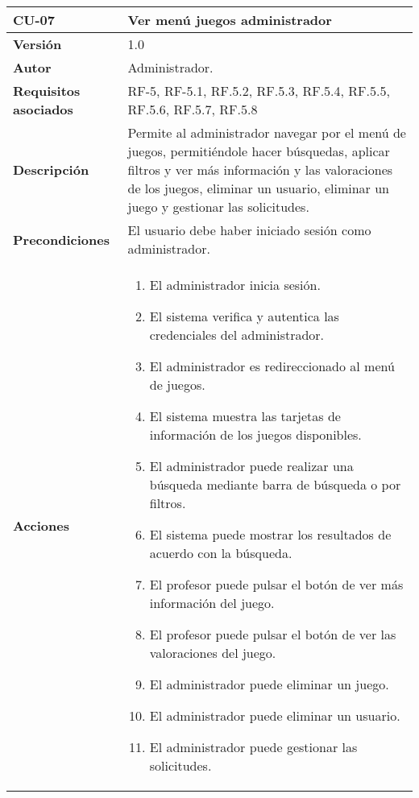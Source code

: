\begin{table}[h!]
	\centering
	\begin{tabularx}{\linewidth}{ p{} p{} }
		\toprule
		\textbf{CU-07}    & \textbf{Ver menú juegos administrador}\\
		\toprule
		\textbf{Versión}              & 1.0    \\
		\textbf{Autor}                & Administrador. \\
		\textbf{Requisitos asociados} & RF-5, RF-5.1, RF.5.2, RF.5.3, RF.5.4, RF.5.5, RF.5.6, RF.5.7, RF.5.8 \\
		\textbf{Descripción}          & Permite al administrador navegar por el menú de juegos, permitiéndole hacer búsquedas, aplicar filtros y ver más información y las valoraciones de los juegos, eliminar un usuario, eliminar un juego y gestionar las solicitudes.\\
		\textbf{Precondiciones}         & El usuario debe haber iniciado sesión como administrador. \\
		\textbf{Acciones}             &
		\begin{enumerate}
			\def\labelenumi{\arabic{enumi}.}
			\tightlist
			\item El administrador inicia sesión.
            \item El sistema verifica y autentica las credenciales del administrador.
            \item El administrador es redireccionado al menú de juegos.
            \item El sistema muestra las tarjetas de información de los juegos disponibles.
            \item El administrador puede realizar una búsqueda mediante barra de búsqueda o por filtros.
            \item El sistema puede mostrar los resultados de acuerdo con la búsqueda.
            \item El profesor puede pulsar el botón de ver más información del juego.
            \item El profesor puede pulsar el botón de ver las valoraciones del juego.
            \item El administrador puede eliminar un juego.
            \item El administrador puede eliminar un usuario.
            \item El administrador puede gestionar las solicitudes.
		\end{enumerate}\\

\end{tabularx}
\end{table}
